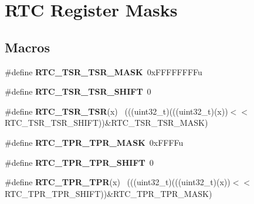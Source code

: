 \hypertarget{group___r_t_c___register___masks}{}\section{R\+T\+C Register Masks}
\label{group___r_t_c___register___masks}
\subsection*{Macros}
\begin{DoxyCompactItemize}
\item 
\hypertarget{group___r_t_c___register___masks_ga9a0f8842e8262ca176fcf028982153af}{}\#define {\bfseries R\+T\+C\+\_\+\+T\+S\+R\+\_\+\+T\+S\+R\+\_\+\+M\+A\+S\+K}~0x\+F\+F\+F\+F\+F\+F\+F\+Fu\label{group___r_t_c___register___masks_ga9a0f8842e8262ca176fcf028982153af}

\item 
\hypertarget{group___r_t_c___register___masks_gad0476d1e39a866b5b5ba4728b55e258a}{}\#define {\bfseries R\+T\+C\+\_\+\+T\+S\+R\+\_\+\+T\+S\+R\+\_\+\+S\+H\+I\+F\+T}~0\label{group___r_t_c___register___masks_gad0476d1e39a866b5b5ba4728b55e258a}

\item 
\hypertarget{group___r_t_c___register___masks_ga77fdb2a31f6b8644e3784f5cd65bb52b}{}\#define {\bfseries R\+T\+C\+\_\+\+T\+S\+R\+\_\+\+T\+S\+R}(x)                                                  ~(((uint32\+\_\+t)(((uint32\+\_\+t)(x))$<$$<$R\+T\+C\+\_\+\+T\+S\+R\+\_\+\+T\+S\+R\+\_\+\+S\+H\+I\+F\+T))\&R\+T\+C\+\_\+\+T\+S\+R\+\_\+\+T\+S\+R\+\_\+\+M\+A\+S\+K)\label{group___r_t_c___register___masks_ga77fdb2a31f6b8644e3784f5cd65bb52b}

\item 
\hypertarget{group___r_t_c___register___masks_ga2682f687fa561be2f002fc574d48cc79}{}\#define {\bfseries R\+T\+C\+\_\+\+T\+P\+R\+\_\+\+T\+P\+R\+\_\+\+M\+A\+S\+K}~0x\+F\+F\+F\+Fu\label{group___r_t_c___register___masks_ga2682f687fa561be2f002fc574d48cc79}

\item 
\hypertarget{group___r_t_c___register___masks_ga624a290f73478b3ca2687ac49cc78fb2}{}\#define {\bfseries R\+T\+C\+\_\+\+T\+P\+R\+\_\+\+T\+P\+R\+\_\+\+S\+H\+I\+F\+T}~0\label{group___r_t_c___register___masks_ga624a290f73478b3ca2687ac49cc78fb2}

\item 
\hypertarget{group___r_t_c___register___masks_gaa16b7c11dc2683ecd02be0f187100e98}{}\#define {\bfseries R\+T\+C\+\_\+\+T\+P\+R\+\_\+\+T\+P\+R}(x)                                                  ~(((uint32\+\_\+t)(((uint32\+\_\+t)(x))$<$$<$R\+T\+C\+\_\+\+T\+P\+R\+\_\+\+T\+P\+R\+\_\+\+S\+H\+I\+F\+T))\&R\+T\+C\+\_\+\+T\+P\+R\+\_\+\+T\+P\+R\+\_\+\+M\+A\+S\+K)\label{group___r_t_c___register___masks_gaa16b7c11dc2683ecd02be0f187100e98}


\end{DoxyCompactItemize}
